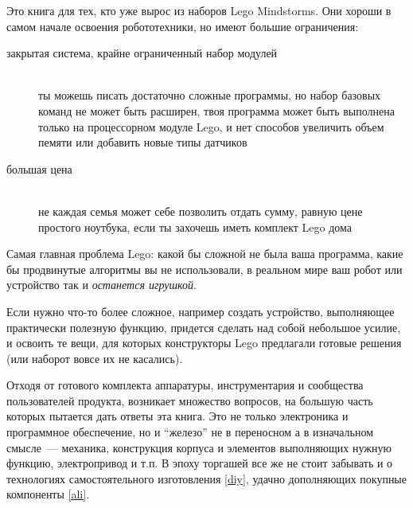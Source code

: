 \clearpage{}\secdown

\noindent
Это книга для тех, кто уже вырос из наборов Lego Mindstorms.
Они хороши в самом начале освоения робототехники, но имеют большие
ограничения:

\begin{description}

\item[закрытая система, крайне ограниченный набор модулей]\ \\ты можешь писать
достаточно сложные программы, но набор базовых команд не может быть расширен,
твоя программа может быть выполнена только на процессорном модуле Lego, и нет
способов увеличить объем пемяти или добавить новые типы датчиков

\item[большая цена]\ \\не каждая семья может себе позволить отдать сумму,
равную цене простого ноутбука, если ты захочешь иметь комплект Lego дома

\end{description}
\clearpage

Самая главная проблема Lego: какой бы сложной не была ваша программа, какие бы
продвинутые алгоритмы вы не использовали, в реальном мире ваш робот или
устройство так и \textit{останется игрушкой}.


Если нужно что-то более сложное, например создать устройство, выполняющее
практически полезную функцию, придется сделать над собой небольшое усилие, и
освоить те вещи, для которых конструкторы Lego предлагали готовые решения (или
наборот вовсе их не касались).

Отходя от готового комплекта аппаратуры, инструментария и сообщества
пользователей продукта, возникает множество вопросов, на большую часть которых
пытается дать ответы эта книга. Это не только электроника и программное
обеспечение, но и ``железо'' не в переносном а в изначальном смысле\ ---
механика, конструкция корпуса и элементов выполняющих нужную функцию,
электропривод и т.п. В эпоху торгашей все же не стоит забывать и о технологиях
самостоятельного изготовления \ref{diy}, удачно дополняющих покупные компоненты
\ref{ali}.

\secup
